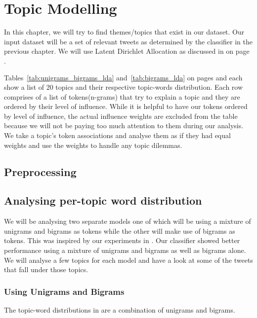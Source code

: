 \chapter{Topic Modelling}
\label{cha:topic_modelling}
In this chapter, we will try to find themes/topics that exist in our dataset. Our input dataset will
be a set of relevant tweets as determined by the classifier in the previous chapter. We will use
Latent Dirichlet Allocation as discussed in  on page \pageref{sec:bg_lda}.

Tables~\ref{tab:unigrams_bigrams_lda} and~\ref{tab:bigrams_lda} on pages
\pageref{tab:unigrams_bigrams_lda} and \pageref{tab:bigrams_lda} each show a list of 20 topics and
their respective topic-words distribution. Each row comprises of a list of tokens(n-grams) that try
to explain a topic and they are ordered by their level of influence. While it is helpful to have our
tokens ordered by level of influence, the actual influence weights are excluded from the table
because we will not be paying too much attention to them during our analysis. We take a topic's
token associations and analyse them as if they had equal weights and use the weights to handle any
topic dilemmas.

\section{Preprocessing}
\label{sec:lda_preprocessing}

\section{Analysing per-topic word distribution}
\label{sec:analysing_topic_word_distribution}
We will be analysing two separate models one of which will be using a mixture of unigrams and
bigrams as tokens while the other will make use of bigrams as tokens. This was inspired by our
experiments in . Our classifier showed better performance using
a mixture of unigrams and bigrams as well as bigrams alone. We will analyse a few topics for each
model and have a look at some of the tweets that fall under those topics.

\subsection{Using Unigrams and Bigrams}
\label{sec:unigrams_bigrams_lda}
The topic-word distributions in  are a combination of unigrams
and bigrams.

